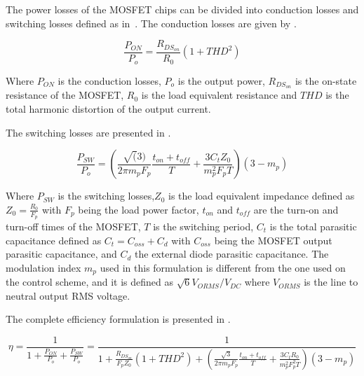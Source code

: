 The power losses of the MOSFET chips can be divided into conduction losses and switching losses defined as in~\cite{Costa:SiC_MOSFET_losses:2023}. The conduction losses are given by .

\begin{equation}
	\frac{P_{ON}}{P_o} = \frac{R_{DS_{on}}}{R_0} (1+THD^2)
	\label{eq:conduction_losses}
\end{equation}

Where $P_{ON}$ is the conduction losses, $P_o$ is the output power, $R_{DS_{on}}$ is the on-state resistance of the MOSFET, $R_0$ is the load equivalent resistance and $THD$ is the total harmonic distortion of the output current.

The switching losses are presented in .

\begin{equation}
	\frac{P_{SW}}{P_o} = \left( \frac{\sqrt(3)}{2\pi m_p F_p}\frac{t_{on}+t_{off}}{T}+\frac{3 C_t Z_0}{m_p^2 F_p T} \right)(3-m_p)
	\label{eq:switching_losses}
\end{equation}

Where $P_{SW}$ is the switching losses,$Z_0$ is the load equivalent impedance defined as $Z_0 = \frac{R_0}{F_p}$ with $F_p$ being the load power factor, $t_{on}$ and $t_{off}$ are the turn-on and turn-off times of the MOSFET, $T$ is the switching period, $C_t$ is the total parasitic capacitance defined as $C_t = C_{oss} + C_d$ with $C_{oss}$ being the MOSFET output parasitic capacitance, and $C_d$ the external diode parasitic capacitance. The modulation index $m_p$ used in this formulation is different from the one used on the control scheme, and it is defined as $\sqrt{6} V_{ORMS}/V_{DC}$ where $V_{ORMS}$ is the line to neutral output RMS voltage.

The complete efficiency formulation is presented in .

\begin{equation}
	\eta = \frac{1}{1 + \frac{P_{ON}}{P_o} + \frac{P_{SW}}{P_o}} = \frac{1}{1 + \frac{R_{DS_{on}}}{F_p Z_0} (1+THD^2) + \left( \frac{\sqrt{3}}{2\pi m_p F_p}\frac{t_{on}+t_{off}}{T}+\frac{3 C_t R_0}{m_p^2 F_p^2 T} \right)(3-m_p)}
	\label{eq:efficiency}
\end{equation}

